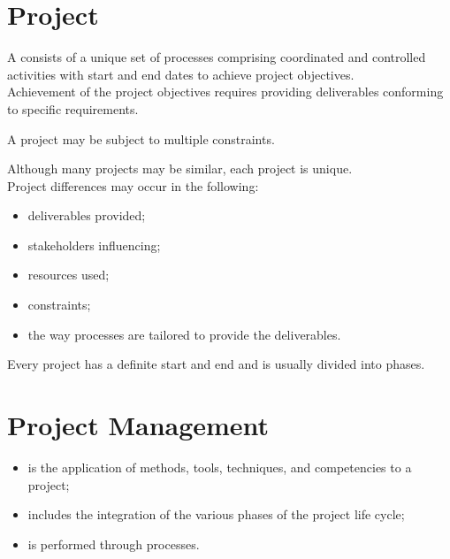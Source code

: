 \documentclass[letterpaper,10pt,english]{jupyterBook}
\begin{document}
\section{Project}
\label{\detokenize{PM/pm-concepts:project}}
\sphinxAtStartPar
A  consists of a unique set of processes comprising coordinated and controlled activities with start and end dates to achieve project objectives. \\
Achievement of the project objectives requires providing deliverables conforming to specific requirements.

\sphinxAtStartPar
A project may be subject to multiple constraints.

\sphinxAtStartPar
Although many projects may be similar, each project is unique. \\
Project differences may occur in the following:
\begin{itemize}
\item {} 
\sphinxAtStartPar
deliverables provided;

\item {} 
\sphinxAtStartPar
stakeholders influencing;

\item {} 
\sphinxAtStartPar
resources used;

\item {} 
\sphinxAtStartPar
constraints;

\item {} 
\sphinxAtStartPar
the way processes are tailored to provide the deliverables.

\end{itemize}

\sphinxAtStartPar
Every project has a definite start and end and is usually divided into phases.


\section{Project Management}
\label{\detokenize{PM/pm-concepts:project-management}}
\sphinxAtStartPar
{}
\begin{itemize}
\item {} 
\sphinxAtStartPar
is the application of methods, tools, techniques, and competencies to a project;

\item {} 
\sphinxAtStartPar
includes the integration of the various phases of the project life cycle;

\item {} 
\sphinxAtStartPar
is performed through processes.

\end{itemize}
\end{document}
